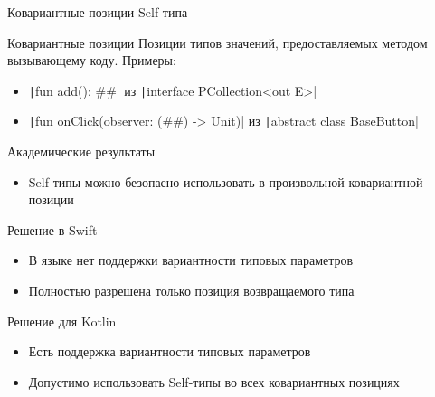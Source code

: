 \documentclass[usenames, dvipsnames]{beamer}
\begin{document}
    \begin{frame}[fragile]{Ковариантные позиции Self-типа}
        \begin{block}{Ковариантные позиции}
            Позиции типов значений, предоставляемых методом вызывающему коду.
            Примеры:
            \begin{itemize}
                \item \texttt|fun add(): ##| из \texttt|interface PCollection<out E>|
                \item \texttt|fun onClick(observer: (##) -> Unit)| из \texttt|abstract class BaseButton|
            \end{itemize}
        \end{block}

        \begin{block}{Академические результаты}
            \begin{itemize}
                \item Self-типы можно безопасно использовать в произвольной ковариантной позиции
            \end{itemize}
        \end{block}

        \begin{block}{Решение в Swift}
            \begin{itemize}
                \item В языке нет поддержки вариантности типовых параметров
                \item Полностью разрешена только позиция возвращаемого типа
            \end{itemize}
        \end{block}

        \begin{block}{Решение для Kotlin}
            \begin{itemize}
                \item Есть поддержка вариантности типовых параметров
                \item Допустимо использовать Self-типы во всех ковариантных позициях
            \end{itemize}
        \end{block}
    \end{frame}
\end{document}
